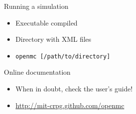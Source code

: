 \documentclass[serif]{beamer}
\begin{document}

\begin{frame}{Running a simulation}
  \begin{itemize}
  \item<1-> Executable compiled
  \item<1-> Directory with XML files
  \item<1-> \texttt{openmc [/path/to/directory]}
  \end{itemize}
\end{frame}


\begin{frame}{Online documentation}
  \begin{itemize}
  \item<1-> When in doubt, check the user's guide!
  \item<1-> \url{http://mit-crpg.github.com/openmc}
  \end{itemize}
\end{frame}

\end{document}

